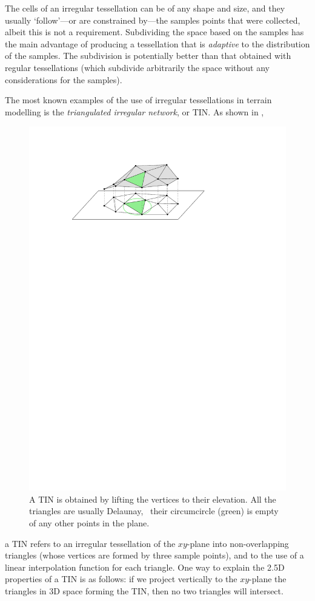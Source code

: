 The cells of an irregular tessellation can be of any shape and size, and they usually `follow'---or are constrained by---the samples points that were collected, albeit this is not a requirement. 
Subdividing the space based on the samples has the main advantage of producing a tessellation that is \emph{adaptive} to the distribution of the samples. 
The subdivision is potentially better than that obtained with regular tessellations (which subdivide arbitrarily the space without any considerations for the samples).

%

The most known examples of the use of irregular tessellations in terrain modelling is the \emph{triangulated irregular network}, or TIN\@.
As shown in ,
\begin{figure}
  \centering
  \includegraphics[width=0.55\linewidth]{figs/tin}
  \caption{A TIN is obtained by lifting the vertices to their elevation. All the triangles are usually Delaunay, \ie\ their circumcircle (green) is empty of any other points in the plane.}
\label{fig:tin}
\end{figure}
a TIN refers to an irregular tessellation of the $xy$-plane into non-overlapping triangles (whose vertices are formed by three sample points), and to the use of a linear interpolation function for each triangle. 
One way to explain the 2.5D properties of a TIN is as follows: if we project vertically to the $xy$-plane the triangles in 3D space forming the TIN, then no two triangles will intersect.

